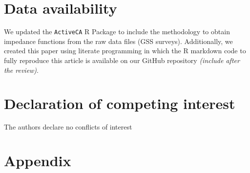 \documentclass[preprint, 3p,
authoryear]{elsarticle} %
\begin{document}
\section*{Data availability}\label{data-availability}

We updated the \texttt{ActiveCA} R Package to include the methodology to
obtain impedance functions from the raw data files (GSS surveys).
Additionally, we created this paper using literate programming in which
the R markdown code to fully reproduce this article is available on our
GitHub repository \emph{(include after the review)}.

\section{Declaration of competing
interest}\label{declaration-of-competing-interest}

The authors declare no conflicts of interest

\section*{Appendix}\label{appendix}

\renewcommand{\thetable}{A.1}

\begingroup\fontsize{8}{10}\selectfont
\end{document}
